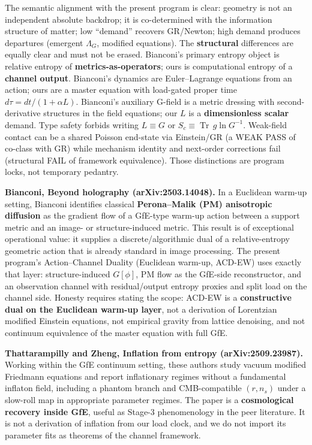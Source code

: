 \documentclass[
  11pt,
]{article}
\begin{document}
The semantic alignment with the present program is clear: geometry is not an independent absolute backdrop; it is co-determined with the information structure of matter; low ``demand'' recovers GR/Newton; high demand produces departures (emergent \(\Lambda_G\), modified equations). The \textbf{structural} differences are equally clear and must not be erased. Bianconi's primary entropy object is relative entropy of \textbf{metrics-as-operators}; ours is computational entropy of a \textbf{channel output}. Bianconi's dynamics are Euler--Lagrange equations from an action; ours are a master equation with load-gated proper time \(d\tau = dt/(1+\alpha L)\). Bianconi's auxiliary G-field is a metric dressing with second-derivative structures in the field equations; our \(L\) is a \textbf{dimensionless scalar} demand. Type safety forbids writing \(L \equiv G\) or \(S_c \equiv \operatorname{Tr}\, g\ln G^{-1}\). Weak-field contact can be a shared Poisson end-state via Einstein/GR (a WEAK PASS of co-class with GR) while mechanism identity and next-order corrections fail (structural FAIL of framework equivalence). Those distinctions are program locks, not temporary pedantry.

\textbf{Bianconi, Beyond holography (arXiv:2503.14048).} In a Euclidean warm-up setting, Bianconi identifies classical \textbf{Perona--Malik (PM) anisotropic diffusion} as the gradient flow of a GfE-type warm-up action between a support metric and an image- or structure-induced metric. This result is of exceptional operational value: it supplies a discrete/algorithmic dual of a relative-entropy geometric action that is already standard in image processing. The present program's Action--Channel Duality (Euclidean warm-up, ACD-EW) uses exactly that layer: structure-induced \(G[\phi]\), PM flow as the GfE-side reconstructor, and an observation channel with residual/output entropy proxies and split load on the channel side. Honesty requires stating the scope: ACD-EW is a \textbf{constructive dual on the Euclidean warm-up layer}, not a derivation of Lorentzian modified Einstein equations, not empirical gravity from lattice denoising, and not continuum equivalence of the master equation with full GfE.

\textbf{Thattarampilly and Zheng, Inflation from entropy (arXiv:2509.23987).} Working within the GfE continuum setting, these authors study vacuum modified Friedmann equations and report inflationary regimes without a fundamental inflaton field, including a phantom branch and CMB-compatible \((r,n_s)\) under a slow-roll map in appropriate parameter regimes. The paper is a \textbf{cosmological recovery inside GfE}, useful as Stage-3 phenomenology in the peer literature. It is not a derivation of inflation from our load clock, and we do not import its parameter fits as theorems of the channel framework.
\end{document}
